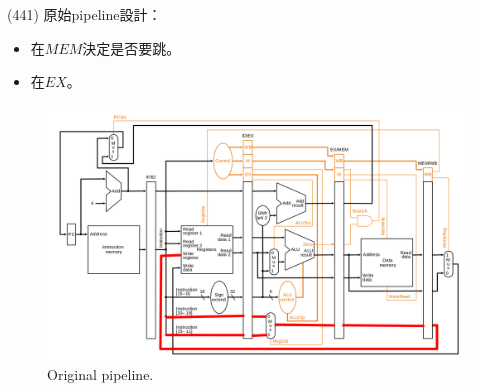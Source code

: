 \item \begin{theorem}{(441)} 原始pipeline設計：\begin{itemize}
        \item {}在$MEM$決定是否要跳。
        \item {}在$EX$。
    \end{itemize}
    \begin{figure}[H]
        \centering
        \includegraphics[scale=0.3]{img/pipeline-org.png}
        \caption{Original pipeline.}
        \label{img:pipeline-org}
    \end{figure}
\end{theorem}

